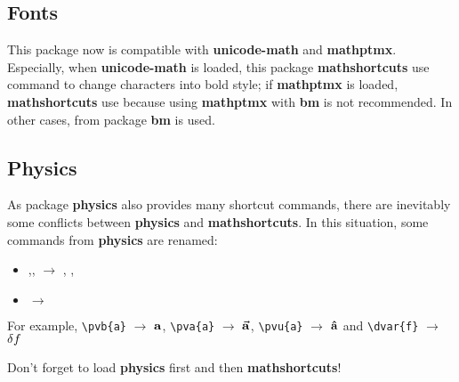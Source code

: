 \documentclass{article}
\begin{document}
\subsection{Fonts}

This package now is compatible with \textbf{unicode-math} and \textbf{mathptmx}. Especially, when \textbf{unicode-math} is loaded, this package \textbf{mathshortcuts} use  command to change characters into bold style; if \textbf{mathptmx} is loaded, \textbf{mathshortcuts} use  because using \textbf{mathptmx} with \textbf{bm} is not recommended. In other cases,  from package \textbf{bm} is used. 

\subsection{Physics}

As package \textbf{physics} also provides many shortcut commands, there are inevitably some conflicts between \textbf{physics} and \textbf{mathshortcuts}. In this situation, some commands from \textbf{physics} are renamed:
\begin{itemize}
    \item {},, $\longrightarrow$ , , 
    \item {} $\longrightarrow$ 
\end{itemize}
For example, \verb"\pvb{a}" $\longrightarrow$ $\pvb{a}$, \verb"\pva{a}" $\longrightarrow$ $\pva{a}$, \verb"\pvu{a}" $\longrightarrow$ $\pvu{a}$ and \verb"\dvar{f}" $\longrightarrow$ $\dvar{f}$

\begin{marker}
Don't forget to load \textbf{physics} first and then \textbf{mathshortcuts}!
\end{marker}
\end{document}
